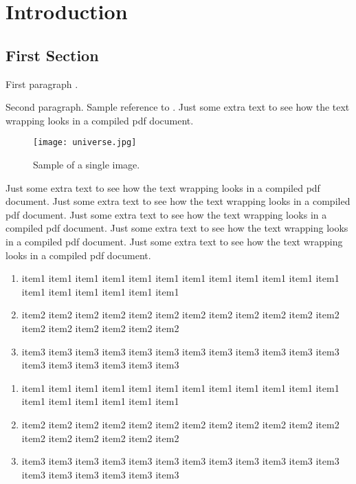 \chapter{Introduction}

\section{First Section}
First paragraph \cite{Doe}.

Second paragraph.  Sample reference to .  Just some extra text to see how the text
wrapping looks in a compiled pdf document.

\begin{figure}
  \centering
  \texttt{[image: universe.jpg]} \\
  \caption{Sample of a single image.}\label{fig:single2}
\end{figure}

Just some extra text to see how the text wrapping looks in a
compiled pdf document. Just some extra text to see how the text
wrapping looks in a compiled pdf document. Just some extra text to
see how the text wrapping looks in a compiled pdf document. Just
some extra text to see how the text wrapping looks in a compiled
pdf document. Just some extra text to see how the text wrapping
looks in a compiled pdf document.
\newpage
\begin{enumerate}
	\item item1 item1 item1 item1 item1 item1 item1 item1 item1 item1 item1 item1 item1 item1 item1 item1 item1 item1 
	\item item2 item2 item2 item2 item2 item2 item2 item2 item2 item2 item2 item2 item2 item2 item2 item2 item2 item2 
	\item item3 item3 item3 item3 item3 item3 item3 item3 item3 item3 item3 item3 item3 item3 item3 item3 item3 item3 
\end{enumerate}

\begin{enumerate}
	\packed
	\item item1 item1 item1 item1 item1 item1 item1 item1 item1 item1 item1 item1 item1 item1 item1 item1 item1 item1 
	\item item2 item2 item2 item2 item2 item2 item2 item2 item2 item2 item2 item2 item2 item2 item2 item2 item2 item2 
	\item item3 item3 item3 item3 item3 item3 item3 item3 item3 item3 item3 item3 item3 item3 item3 item3 item3 item3 
\end{enumerate}

